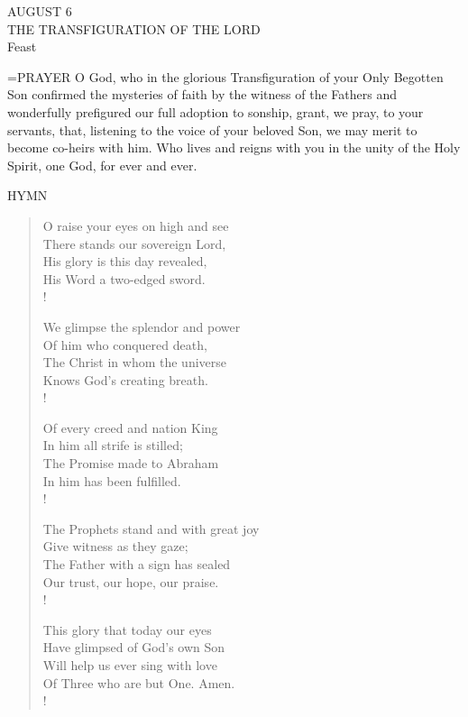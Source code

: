 \begin{center}\normalsize AUGUST 6\\
\footnotesize THE TRANSFIGURATION OF THE LORD\\
\footnotesize Feast\\
\end{center}

\hangindent=\parindent \small{PRAYER 
O God, who in the glorious Transfiguration
of your Only Begotten Son
confirmed the mysteries of faith by the witness of the Fathers
and wonderfully prefigured our full adoption to sonship,
grant, we pray, to your servants,
that, listening to the voice of your beloved Son,
we may merit to become co-heirs with him.
Who lives and reigns with you in the unity of the Holy Spirit,
one God, for ever and ever.\\}
 

\noindent\small{\uppercase{Hymn}}\normalsize\label{transfiguration:hymn}
\begin{verse}
O raise your eyes on high and see\\
There stands our sovereign Lord,\\
His glory is this day revealed,\\
His Word a two-edged sword.\\!

We glimpse the splendor and power\\
Of him who conquered death,\\
The Christ in whom the universe\\
Knows God’s creating breath.\\!

Of every creed and nation King\\
In him all strife is stilled;\\
The Promise made to Abraham\\
In him has been fulfilled.\\!

The Prophets stand and with great joy\\
Give witness as they gaze;\\
The Father with a sign has sealed\\
Our trust, our hope, our praise.\\!

This glory that today our eyes\\
Have glimpsed of God’s own Son\\
Will help us ever sing with love\\
Of Three who are but One. Amen.\\!
\end{verse}

